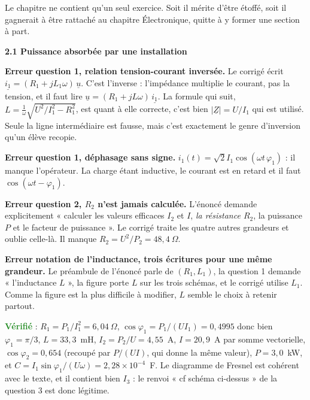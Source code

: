 \documentclass[a4paper,11pt]{article}
\newcommand{\exo}[1]{\vspace{0.7\baselineskip}\noindent\textbf{\large #1}\par\nopagebreak\vspace{0.2\baselineskip}}
\newcommand{\erreur}{\textcolor{BrickRed}{\textbf{Erreur}}}
\newcommand{\verifie}{\textcolor{ForestGreen}{\textbf{Vérifié}}}
\begin{document}
\medskip
Le chapitre ne contient qu'un seul exercice. Soit il mérite d'être étoffé, soit il gagnerait à être
rattaché au chapitre \'Electronique, quitte à y former une section à part.

\exo{2.1 Puissance absorbée par une installation}

\erreur{} \textbf{question 1, relation tension-courant inversée.} Le corrigé écrit
$\underline{i_1}=(R_1+jL_1\omega)\,\underline{u}$. C'est l'inverse : l'impédance multiplie le courant,
pas la tension, et il faut lire $\underline{u}=(R_1+jL\omega)\,\underline{i_1}$. La formule qui suit,
$L=\frac{1}{\omega}\sqrt{U^2/I_1^2-R_1^2}$, est quant à elle correcte, c'est bien
$|\underline{Z}|=U/I_1$ qui est utilisé. Seule la ligne intermédiaire est fausse, mais c'est
exactement le genre d'inversion qu'un élève recopie.

\medskip
\erreur{} \textbf{question 1, déphasage sans signe.} $i_1(t)=\sqrt{2}I_1\cos(\omega t\,\varphi_1)$ :
il manque l'opérateur. La charge étant inductive, le courant est en retard et il faut
$\cos(\omega t-\varphi_1)$.

\medskip
\erreur{} \textbf{question 2, $R_2$ n'est jamais calculée.} L'énoncé demande explicitement
« calculer les valeurs efficaces $I_2$ et $I$, \textit{la résistance $R_2$}, la puissance $P$ et le
facteur de puissance ». Le corrigé traite les quatre autres grandeurs et oublie celle-là. Il
manque $R_2=U^2/P_2=48{,}4~\Omega$.

\medskip
\erreur{} \textbf{notation de l'inductance, trois écritures pour une même grandeur.} Le préambule
de l'énoncé parle de $(R_1,L_1)$, la question 1 demande « l'inductance $L$ », la figure porte $L$ sur
les trois schémas, et le corrigé utilise $L_1$. Comme la figure est la plus difficile à modifier,
$L$ semble le choix à retenir partout.

\medskip
\verifie{} : $R_1=P_1/I_1^2=6{,}04~\Omega$, $\cos\varphi_1=P_1/(UI_1)=0{,}4995$ donc bien
$\varphi_1=\pi/3$, $L=33{,}3$~mH, $I_2=P_2/U=4{,}55$~A, $I=20{,}9$~A par somme vectorielle,
$\cos\varphi_2=0{,}654$ (recoupé par $P/(UI)$, qui donne la même valeur), $P=3{,}0$~kW, et
$C=I_1\sin\varphi_1/(U\omega)=2{,}28\times10^{-4}$~F. Le diagramme de Fresnel est cohérent avec le
texte, et il contient bien $I_3$ : le renvoi « cf schéma ci-dessus » de la question 3 est donc
légitime.
\end{document}
